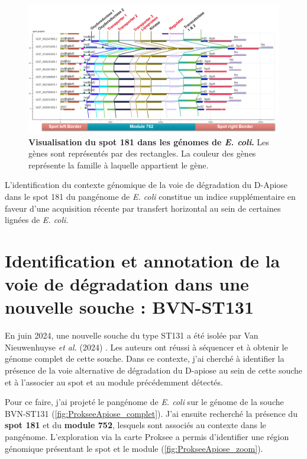 \begin{figure}[htbp] 
    \centering
    \includegraphics[width=\textwidth]{images/ApioseColiSpotModule.png}
    \caption[Visualisation du spot 181 dans les génomes de \textit{E. coli}]{\textbf{Visualisation du spot 181 dans les génomes de \textit{E. coli}.} Les gènes sont représentés par des rectangles. La couleur des gènes représente la famille à laquelle appartient le gène.}
    \label{fig:spot_apiose}
\end{figure}

L’identification du contexte génomique de la voie de dégradation du D-Apiose dans le spot 181 du pangénome de \textit{E. coli} constitue un indice supplémentaire en faveur d’une acquisition récente par transfert horizontal au sein de certaines lignées de \textit{E. coli}.

\section{Identification et annotation de la voie de dégradation dans une nouvelle souche : BVN-ST131}

En juin 2024, une nouvelle souche du type ST131 a été isolée par Van Nieuwenhuyse \textit{et al.} (2024) \cite{van_nieuwenhuyse_phage-mediated_2024}. Les auteurs ont réussi à séquencer et à obtenir le génome complet de cette souche. Dans ce contexte, j'ai cherché à identifier la présence de la voie alternative de dégradation du D-apiose au sein de cette souche et à l'associer au spot et au module précédemment détectés.

\newpage

Pour ce faire, j'ai projeté le pangénome de \textit{E. coli} sur le génome de la souche BVN-ST131 (\autoref{fig:ProkseeApiose_complet}). J'ai ensuite recherché la présence du \textbf{spot 181} et du \textbf{module 752}, lesquels sont associés au contexte dans le pangénome. L'exploration via la carte Proksee \cite{grant_proksee_2023} a permis d'identifier une région génomique présentant le spot et le module (\autoref{fig:ProkseeApiose_zoom}).

